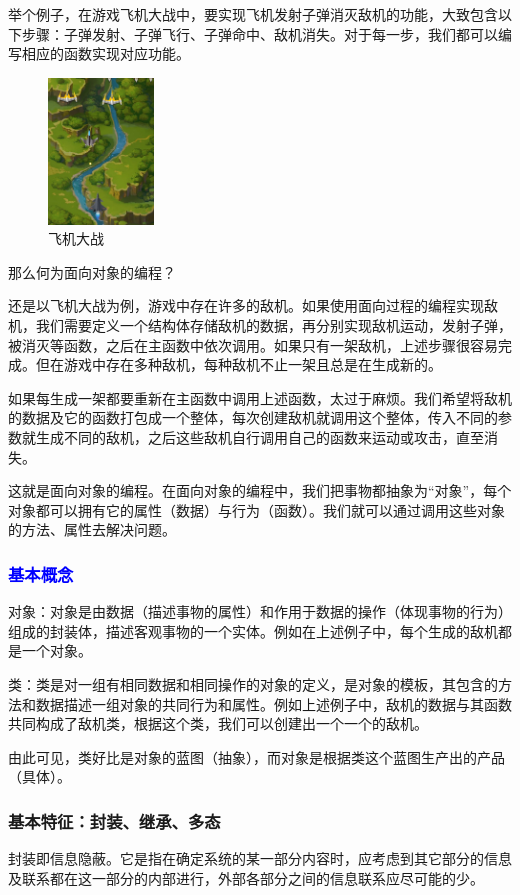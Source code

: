 \documentclass[UTF8]{ctexart}
\begin{document}
举个例子，在游戏飞机大战中，要实现飞机发射子弹消灭敌机的功能，大致包含以下步骤：子弹发射、子弹飞行、子弹命中、敌机消失。对于每一步，我们都可以编写相应的函数实现对应功能。
\begin{figure}[H]
	\centering
	\includegraphics[width=0.25\textwidth,keepaspectratio]{picture/11.jpg}
	\caption{飞机大战}
\end{figure}
那么何为面向对象的编程？

还是以飞机大战为例，游戏中存在许多的敌机。如果使用面向过程的编程实现敌机，我们需要定义一个结构体存储敌机的数据，再分别实现敌机运动，发射子弹，被消灭等函数，之后在主函数中依次调用。如果只有一架敌机，上述步骤很容易完成。但在游戏中存在多种敌机，每种敌机不止一架且总是在生成新的。

如果每生成一架都要重新在主函数中调用上述函数，太过于麻烦。我们希望将敌机的数据及它的函数打包成一个整体，每次创建敌机就调用这个整体，传入不同的参数就生成不同的敌机，之后这些敌机自行调用自己的函数来运动或攻击，直至消失。

这就是面向对象的编程。在面向对象的编程中，我们把事物都抽象为“对象”，每个对象都可以拥有它的属性（数据）与行为（函数）。我们就可以通过调用这些对象的方法、属性去解决问题。
\subsubsection{\textcolor{blue}{基本概念}}
对象：对象是由数据（描述事物的属性）和作用于数据的操作（体现事物的行为）组成的封装体，描述客观事物的一个实体。例如在上述例子中，每个生成的敌机都是一个对象。

类：类是对一组有相同数据和相同操作的对象的定义，是对象的模板，其包含的方法和数据描述一组对象的共同行为和属性。例如上述例子中，敌机的数据与其函数共同构成了敌机类，根据这个类，我们可以创建出一个一个的敌机。

由此可见，类好比是对象的蓝图（抽象），而对象是根据类这个蓝图生产出的产品（具体）。
\subsubsection{基本特征：封装、继承、多态}
封装即信息隐蔽。它是指在确定系统的某一部分内容时，应考虑到其它部分的信息及联系都在这一部分的内部进行，外部各部分之间的信息联系应尽可能的少。
\end{document}

